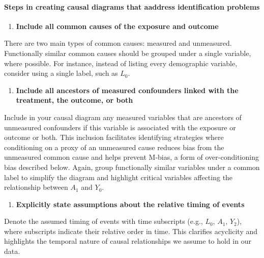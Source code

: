 \documentclass[
  singlecolumn]{article}
\let\oldparagraph\paragraph
\renewcommand{\paragraph}[1]{\oldparagraph{#1}\mbox{}}
\providecommand{\tightlist}{%
  \setlength{\itemsep}{0pt}\setlength{\parskip}{0pt}}\usepackage{longtable,booktabs,array}
\begin{document}
\paragraph{Steps in creating causal diagrams that aaddress
identification
problems}\label{steps-in-creating-causal-diagrams-that-aaddress-identification-problems}

\begin{enumerate}
\def\labelenumi{\arabic{enumi}.}
\tightlist
\item
  \textbf{Include all common causes of the exposure and outcome}
\end{enumerate}

There are two main types of common causes: measured and unmeasured.
Functionally similar common causes should be grouped under a single
variable, where possible. For instance, instead of listing every
demographic variable, consider using a single label, such as \(L_0\).

\begin{enumerate}
\def\labelenumi{\arabic{enumi}.}
\setcounter{enumi}{1}
\tightlist
\item
  \textbf{Include all ancestors of measured confounders linked with the
  treatment, the outcome, or both}
\end{enumerate}

Include in your causal diagram any measured variables that are ancestors
of unmeasured confounders if this variable is associated with the
exposure or outcome or both. This inclusion facilitates identifying
strategies where conditioning on a proxy of an unmeasured cause reduces
bias from the unmeasured common cause and helps prevent M-bias, a form
of over-conditioning bias described below. Again, group functionally
similar variables under a common label to simplify the diagram and
highlight critical variables affecting the relationship between \(A_1\)
and \(Y_0\).

\begin{enumerate}
\def\labelenumi{\arabic{enumi}.}
\setcounter{enumi}{2}
\tightlist
\item
  \textbf{Explicitly state assumptions about the relative timing of
  events}
\end{enumerate}

Denote the assumed timing of events with time subscripts (e.g., \(L_0\),
\(A_1\), \(Y_2\)), where subscripts indicate their relative order in
time. This clarifies acyclicity and highlights the temporal nature of
causal relationships we assume to hold in our data.
\end{document}
